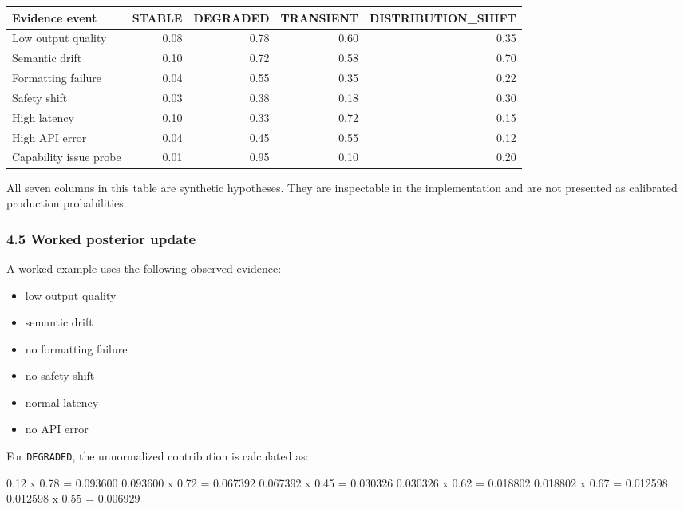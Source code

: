 \documentclass[
]{article}
\newenvironment{Shaded}{}{}
\newcommand{\NormalTok}[1]{#1}
\providecommand{\tightlist}{%
  \setlength{\itemsep}{0pt}\setlength{\parskip}{0pt}}
\begin{document}
\begin{longtable}[]{@{}lrrrr@{}}
\toprule\noalign{}
Evidence event & STABLE & DEGRADED & TRANSIENT & DISTRIBUTION\_SHIFT \\
\midrule\noalign{}
\endhead
\bottomrule\noalign{}
\endlastfoot
Low output quality & 0.08 & 0.78 & 0.60 & 0.35 \\
Semantic drift & 0.10 & 0.72 & 0.58 & 0.70 \\
Formatting failure & 0.04 & 0.55 & 0.35 & 0.22 \\
Safety shift & 0.03 & 0.38 & 0.18 & 0.30 \\
High latency & 0.10 & 0.33 & 0.72 & 0.15 \\
High API error & 0.04 & 0.45 & 0.55 & 0.12 \\
Capability issue probe & 0.01 & 0.95 & 0.10 & 0.20 \\
\end{longtable}

All seven columns in this table are synthetic hypotheses. They are
inspectable in the implementation and are not presented as calibrated
production probabilities.

\subsubsection{4.5 Worked posterior
update}\label{worked-posterior-update}

A worked example uses the following observed evidence:

\begin{itemize}
\tightlist
\item
  low output quality
\item
  semantic drift
\item
  no formatting failure
\item
  no safety shift
\item
  normal latency
\item
  no API error
\end{itemize}

For \texttt{DEGRADED}, the unnormalized contribution is calculated as:

\begin{Shaded}
\begin{Highlighting}[]
\NormalTok{0.12 x 0.78 = 0.093600}
\NormalTok{0.093600 x 0.72 = 0.067392}
\NormalTok{0.067392 x 0.45 = 0.030326}
\NormalTok{0.030326 x 0.62 = 0.018802}
\NormalTok{0.018802 x 0.67 = 0.012598}
\NormalTok{0.012598 x 0.55 = 0.006929}
\end{Highlighting}
\end{Shaded}
\end{document}
